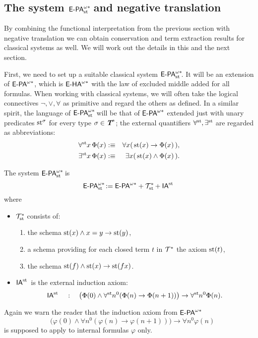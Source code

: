 \subsection{The system $\epaststar$ and negative translation}\label{ss:dst:negative}

By combining the functional interpretation from the previous section with negative translation we can obtain conservation and term extraction results for classical systems as well. We will work out the details in this and the next section.

First, we need to set up a suitable classical system $\epaststar$. It will be an extension of ${\textsf{\upshape E-PA}}^{\omega*}$, which is ${\textsf{\upshape E-HA}}^{\omega*}$ with the law of excluded middle added for all formulas. When working with classical systems, we will often take the logical connectives $\lnot, \lor, \forall$ as primitive and regard the others as defined. In a similar spirit, the language of $\epaststar$ will be that of ${\textsf{\upshape E-PA}}^{\omega*}$ extended just with unary predicates $\operatorname{st}^\sigma$ for every type $\sigma \in \emph{\protect\textbf{T}}^*$; the external quantifiers $\forall^{\operatorname{st}{}}\!, \exists^{\operatorname{st}{}}\!$ are regarded as abbreviations:
\begin{eqnarray*}
\forall^{\operatorname{st}{}}\! x \, \Phi(x) & :\equiv &  \forall x ( \, \operatorname{st}(x)\rightarrow\Phi(x) \, ),\\
\exists^{\operatorname{st}{}}\! x \, \Phi(x) & :\equiv & \exists x (\, \operatorname{st}(x)\wedge\Phi(x) \, ).
\end{eqnarray*}

\begin{dfn}[$\epaststar$] The system $\epaststar$ is
\[{\textsf{\upshape E-PA}}^{\omega*}_{\operatorname{st}{}}\! := {\textsf{\upshape E-PA}}^{\omega*} + \mathcal{T}^*_{\operatorname{st}{}}\! + \textsf{\upshape IA}^{\operatorname{st}{}} \]
where
\begin{itemize}
\item $\mathcal{T}^*_{\operatorname{st}{}}\!$ consists of:
\begin{enumerate}
\item the schema $\operatorname{st}(x) \land x = y \to \operatorname{st}(y)$,
\item a schema providing for each closed term $t$ in $\mathcal{T}^*$ the axiom $\operatorname{st}(t)$,
\item the schema $\operatorname{st}(f)\wedge\operatorname{st}(x)\rightarrow\operatorname{st}(fx)$.
\end{enumerate}
\item $ \textsf{\upshape IA}^{\operatorname{st}{}}$ is the external induction axiom:
\[
\textsf{\upshape IA}^{\operatorname{st}{}} \quad : \quad\big(\Phi(0)\wedge\forall^{\operatorname{st}{}}\! n^0 (\Phi(n)\rightarrow\Phi(n+1) )\big)\rightarrow\forall^{\operatorname{st}{}}\! n^0 \Phi(n).
\]
\end{itemize}
Again we warn the reader that the induction axiom from ${\textsf{\upshape E-PA}}^{\omega*}$
\[ \quad\big(\varphi(0)\wedge\forall n^0 (\varphi(n)\rightarrow\varphi(n+1) )\big)\rightarrow\forall n^0 \varphi(n) \]
is supposed to apply to internal formulas $\varphi$ only.
\end{dfn}

